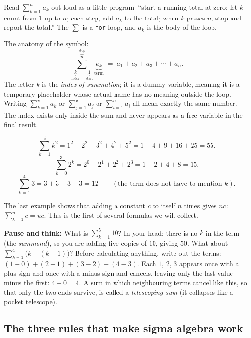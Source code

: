 \begin{intuitionbox}
Read $\displaystyle\sum_{k=1}^{n} a_k$ out loud as a little program: ``start a running total at zero;
let $k$ count from $1$ up to $n$; each step, add $a_k$ to the total; when $k$ passes $n$, stop and
report the total.'' The $\sum$ is a \texttt{for} loop, and $a_k$ is the body of the loop.
\end{intuitionbox}

The anatomy of the symbol:
\[
\sum_{\underbrace{k}_{\text{index}}=\underbrace{1}_{\text{start}}}^{\overbrace{n}^{\text{stop}}}
\underbrace{a_k}_{\text{term}}
\;=\; a_1 + a_2 + a_3 + \cdots + a_n.
\]
The letter $k$ is the \emph{index of summation}; it is a dummy variable, meaning it is a temporary
placeholder whose actual name has no meaning outside the loop. Writing $\sum_{k=1}^{n} a_k$ or
$\sum_{j=1}^{n} a_j$ or $\sum_{i=1}^{n} a_i$ all mean exactly the same number. The index exists only
inside the sum and never appears as a free variable in the final result.

\begin{example}
\label{ch39:ex-unroll}
\[
\sum_{k=1}^{5} k^2 = 1^2 + 2^2 + 3^2 + 4^2 + 5^2 = 1+4+9+16+25 = 55.
\]
\[
\sum_{k=0}^{3} 2^k = 2^0 + 2^1 + 2^2 + 2^3 = 1 + 2 + 4 + 8 = 15.
\]
\[
\sum_{k=1}^{4} 3 = 3 + 3 + 3 + 3 = 12 \qquad(\text{the term does not have to mention } k).
\]
\end{example}

The last example shows that adding a constant $c$ to itself $n$ times gives $nc$:
$\sum_{k=1}^{n} c = nc$. This is the first of several formulas we will collect.

\begin{recoverybox}
\textbf{Pause and think:} What is $\sum_{k=1}^5 10$? In your head: there is no $k$ in the term (the \emph{summand}), so you are adding five copies of $10$, giving $50$. What about $\sum_{k=1}^4 \bigl(k - (k-1)\bigr)$? Before calculating anything, write out the terms: $(1-0) + (2-1) + (3-2) + (4-3)$. Each $1$, $2$, $3$ appears once with a plus sign and once with a minus sign and cancels, leaving only the last value minus the first: $4 - 0 = 4$. A sum in which neighbouring terms cancel like this, so that only the two ends survive, is called a \emph{telescoping sum} (it collapses like a pocket telescope).
\end{recoverybox}

\subsection{The three rules that make sigma algebra work}
\label{ch39:sigma-rules}

